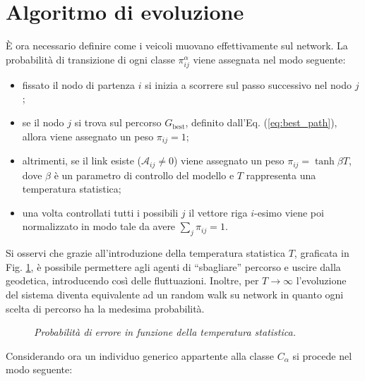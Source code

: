 \section{Algoritmo di evoluzione}
\`E ora necessario definire come i veicoli muovano effettivamente sul network.
La probabilit\`a di transizione di ogni classe $\pi_{ij}^{\alpha}$ viene assegnata nel modo seguente:
\begin{itemize}
    \item fissato il nodo di partenza $i$ si inizia a scorrere sul passo successivo nel nodo $j$;
    \item se il nodo $j$ si trova sul percorso $G_{\text{best}}$, definito dall'Eq. (\ref{eq:best_path}), allora viene assegnato un peso $\pi_{ij}=1$;
    \item altrimenti, se il link esiste ($\mathcal{A}_{ij} \neq 0$) viene assegnato un peso $\pi_{ij}=\tanh \beta T$, dove $\beta$ \`e un parametro di controllo del modello e $T$ rappresenta una temperatura statistica;
    \item una volta controllati tutti i possibili $j$ il vettore riga $i$-esimo viene poi normalizzato in modo tale da avere $\sum_j\pi_{ij}=1$.
\end{itemize}
Si osservi che grazie all'introduzione della temperatura statistica $T$, graficata in Fig. \ref{fig:temperature}, \`e possibile permettere agli agenti di ``sbagliare'' percorso e uscire dalla geodetica, introducendo cos\`i delle fluttuazioni.
Inoltre, per $T \to \infty$ l'evoluzione del sistema diventa equivalente ad un random walk su network in quanto ogni scelta di percorso ha la medesima probabilit\`a.
\begin{figure}[H]
    \centering
    \caption[Temperatura statistica]{\emph{Probabilit\`a di errore in funzione della temperatura statistica.}}
    \label{fig:temperature}
\end{figure}
Considerando ora un individuo generico appartente alla classe $C_{\alpha}$ si procede nel modo seguente:
